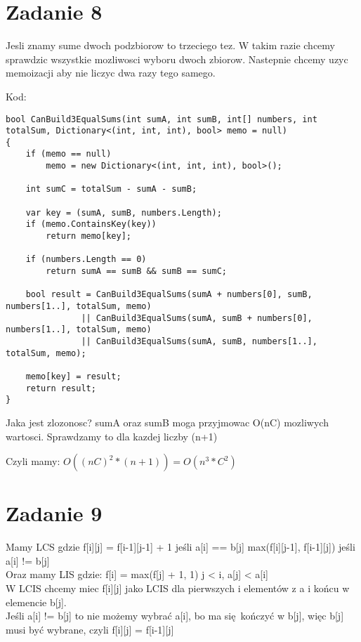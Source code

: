 \documentclass[12pt]{article}
\begin{document}
\section{Zadanie 8}
Jesli znamy sume dwoch podzbiorow to trzeciego tez.
W takim razie chcemy sprawdzic wszystkie mozliwosci wyboru dwoch zbiorow. 
Nastepnie chcemy uzyc memoizacji aby nie liczyc dwa razy tego samego.

Kod:

\begin{lstlisting}
bool CanBuild3EqualSums(int sumA, int sumB, int[] numbers, int totalSum, Dictionary<(int, int, int), bool> memo = null)
{
    if (memo == null)
        memo = new Dictionary<(int, int, int), bool>();

    int sumC = totalSum - sumA - sumB;

    var key = (sumA, sumB, numbers.Length);
    if (memo.ContainsKey(key))
        return memo[key];

    if (numbers.Length == 0)
        return sumA == sumB && sumB == sumC;

    bool result = CanBuild3EqualSums(sumA + numbers[0], sumB, numbers[1..], totalSum, memo)
               || CanBuild3EqualSums(sumA, sumB + numbers[0], numbers[1..], totalSum, memo)
               || CanBuild3EqualSums(sumA, sumB, numbers[1..], totalSum, memo);

    memo[key] = result;
    return result;
}
\end{lstlisting}

Jaka jest zlozonosc? sumA oraz sumB moga przyjmowac O(nC) mozliwych wartosci.
Sprawdzamy to dla kazdej liczby (n+1)

Czyli mamy:
$O((nC)^2 * (n+1)) = O(n^3*C^2)$

\section{Zadanie 9}

Mamy LCS gdzie 
f[i][j] = f[i-1][j-1] + 1 jeśli a[i] == b[j]
          max(f[i][j-1], f[i-1][j]) jeśli a[i] != b[j]\\

Oraz mamy LIS gdzie:
f[i] = max(f[j] + 1, 1) j < i, a[j] < a[i]\\

W LCIS chcemy miec f[i][j] jako LCIS dla pierwszych i elementów z a i końcu w elemencie b[j].\\

Jeśli a[i] != b[j] to nie możemy wybrać a[i], bo ma się kończyć w b[j], więc b[j] musi być wybrane, czyli 
f[i][j] = f[i-1][j]\\
\end{document}

